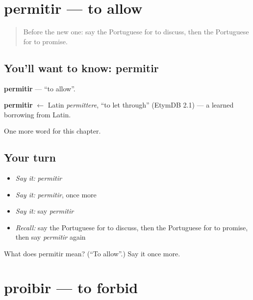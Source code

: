 \section[permitir]{permitir — to allow}

\label{lesson:PT-C140-permitir}



\begin{quote}
Before the new one: say the Portuguese for to discuss, then the Portuguese for to promise.
\end{quote}

\subsection*{You'll want to know: permitir}
\textbf{permitir} — \textquotedblleft{}to allow\textquotedblright{}.

\begin{cousinweb}
\textbf{permitir} $\leftarrow$ Latin \emph{permittere}, \textquotedblleft{}to let through\textquotedblright{} (EtymDB 2.1) — a learned borrowing from Latin.
\end{cousinweb}

\begin{grammarlens}[title={What you've built}]
One more word for this chapter.
\end{grammarlens}

\subsection*{Your turn}
\begin{itemize}
\raggedright
  \item \emph{Say it:} \emph{permitir}
  \item \emph{Say it:} \emph{permitir}, once more
  \item \emph{Say it:} say \emph{permitir}
  \item \emph{Recall:} say the Portuguese for to discuss, then the Portuguese for to promise, then say \emph{permitir} again
\end{itemize}

\begin{tcolorbox}[breakable,colback=teal!4,colframe=teal!35!black,title={Before you move on}]
What does permitir mean? (\textquotedblleft{}To allow\textquotedblright{}.) Say it once more.
\end{tcolorbox}
\section[proibir]{proibir — to forbid}

